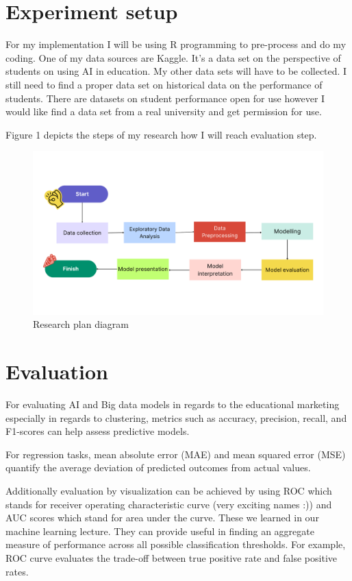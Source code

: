 \documentclass{imc-inf}
\begin{document}
\section{Experiment setup}
For my implementation I will be using R programming to pre-process and do my coding. One of my data sources are Kaggle. It’s a data set on the perspective of students on using AI in education. My other data sets will have to be collected. I still need to find a proper data set on historical data on the performance of students. There are datasets on student performance open for use however I would like find a data set from a real university and get permission for use. 

Figure 1 depicts the steps of my research how I will reach evaluation step. 


\begin{figure}[h]
	\centering
	\includegraphics[width=1.0\textwidth]{Data-collection.png}
	\caption{Research plan diagram}
	\label{fig:example}
\end{figure}

\section{Evaluation}
For evaluating AI and Big data models in regards to the educational marketing especially in regards to clustering, metrics such as accuracy, precision, recall, and F1-scores can help assess predictive models. 

For regression tasks, mean absolute error (MAE) and mean squared error (MSE) quantify the average deviation of predicted outcomes from actual values. 

Additionally evaluation by visualization can be achieved by using ROC which stands for receiver operating characteristic curve (very exciting names :)) and AUC scores which stand for area under the curve. These we learned in our machine learning lecture. They can provide useful in finding an aggregate measure of performance across all possible classification thresholds. For example, ROC curve evaluates the trade-off between true positive rate and false positive rates. 
\end{document}
